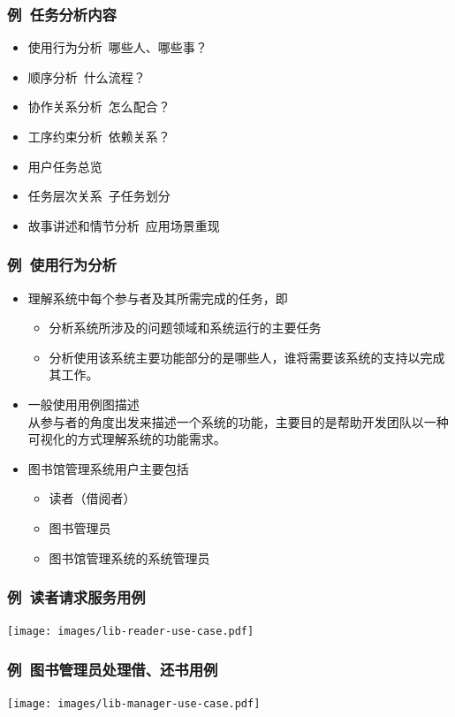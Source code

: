\documentclass{beamer}
\begin{document}
\begin{frame}
	\frametitle{例~{\small 任务分析内容}}
	\beamertemplatetransparentcovereddynamicmedium
	\begin{itemize}[<+->]
		\item 使用行为分析~{\tiny 哪些人、哪些事？}
		\item 顺序分析~{\tiny 什么流程？}
		\item 协作关系分析~{\tiny 怎么配合？}
		\item 工序约束分析~{\tiny 依赖关系？}
		\item 用户任务总览
		\item 任务层次关系~{\tiny 子任务划分}
		\item 故事讲述和情节分析~{\tiny 应用场景重现}
	\end{itemize}
\end{frame}

\begin{frame}
	\frametitle{例~{\small 使用行为分析}}
	\beamertemplatetransparentcovereddynamicmedium
	\begin{itemize}
		\item 理解系统中每个参与者及其所需完成的任务，即
		\begin{itemize}
			\item 分析系统所涉及的问题领域和系统运行的主要任务
			\item 分析使用该系统主要功能部分的是哪些人，谁将需要该系统的支持以完成其工作。
		\end{itemize}
		\pause
		\item 一般使用用例图描述\\{\tiny 从参与者的角度出发来描述一个系统的功能，主要目的是帮助开发团队以一种可视化的方式理解系统的功能需求。}
		\pause
		\item 图书馆管理系统用户主要包括
		\begin{itemize}
			\item 读者（借阅者）
			\item 图书管理员
			\item 图书馆管理系统的系统管理员
		\end{itemize}
	\end{itemize}
\end{frame}

\begin{frame}
	\frametitle{例~{\small 读者请求服务用例}}
	\texttt{[image: images/lib-reader-use-case.pdf]} 
\end{frame}

\begin{frame}
	\frametitle{例~{\small 图书管理员处理借、还书用例}}
	\texttt{[image: images/lib-manager-use-case.pdf]} 
\end{frame}
\end{document}
